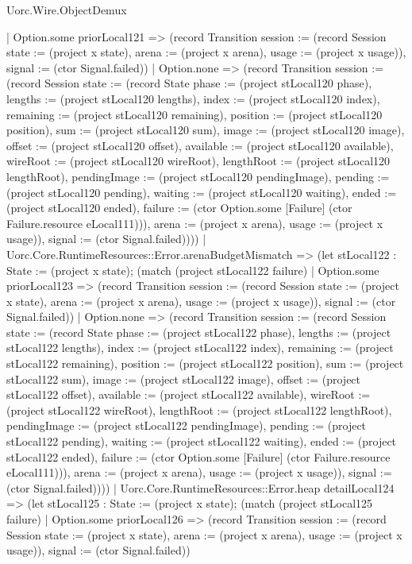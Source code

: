 \begin{lexlean}{Uorc.Wire.ObjectDemux}
\begin{semanticmodule}
{        | Option.some priorLocal121 => (record Transition {session := (record Session {state := (project x state), arena := (project x arena), usage := (project x usage)}), signal := (ctor Signal.failed)})
        | Option.none => (record Transition {session := (record Session {state := (record State {phase := (project stLocal120 phase), lengths := (project stLocal120 lengths), index := (project stLocal120 index), remaining := (project stLocal120 remaining), position := (project stLocal120 position), sum := (project stLocal120 sum), image := (project stLocal120 image), offset := (project stLocal120 offset), available := (project stLocal120 available), wireRoot := (project stLocal120 wireRoot), lengthRoot := (project stLocal120 lengthRoot), pendingImage := (project stLocal120 pendingImage), pending := (project stLocal120 pending), waiting := (project stLocal120 waiting), ended := (project stLocal120 ended), failure := (ctor Option.some [Failure] (ctor Failure.resource eLocal111))}), arena := (project x arena), usage := (project x usage)}), signal := (ctor Signal.failed)})))
      | Uorc.Core.RuntimeResources::Error.arenaBudgetMismatch => (let stLocal122 : State := (project x state); (match (project stLocal122 failure)
        | Option.some priorLocal123 => (record Transition {session := (record Session {state := (project x state), arena := (project x arena), usage := (project x usage)}), signal := (ctor Signal.failed)})
        | Option.none => (record Transition {session := (record Session {state := (record State {phase := (project stLocal122 phase), lengths := (project stLocal122 lengths), index := (project stLocal122 index), remaining := (project stLocal122 remaining), position := (project stLocal122 position), sum := (project stLocal122 sum), image := (project stLocal122 image), offset := (project stLocal122 offset), available := (project stLocal122 available), wireRoot := (project stLocal122 wireRoot), lengthRoot := (project stLocal122 lengthRoot), pendingImage := (project stLocal122 pendingImage), pending := (project stLocal122 pending), waiting := (project stLocal122 waiting), ended := (project stLocal122 ended), failure := (ctor Option.some [Failure] (ctor Failure.resource eLocal111))}), arena := (project x arena), usage := (project x usage)}), signal := (ctor Signal.failed)})))
      | Uorc.Core.RuntimeResources::Error.heap detailLocal124 => (let stLocal125 : State := (project x state); (match (project stLocal125 failure)
        | Option.some priorLocal126 => (record Transition {session := (record Session {state := (project x state), arena := (project x arena), usage := (project x usage)}), signal := (ctor Signal.failed)})
}
\end{semanticmodule}
\end{lexlean}
